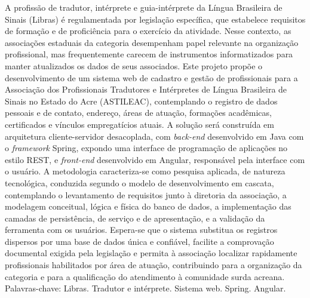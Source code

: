 \documentclass[
        oneside,      %
        english,			
        brazil			 
        ]{abntspiifac}
\begin{document}
\begin{resumo}

A profissão de tradutor, intérprete e guia-intérprete da Língua Brasileira de Sinais (Libras) é regulamentada por legislação específica, que estabelece requisitos de formação e de proficiência para o exercício da atividade. Nesse contexto, as associações estaduais da categoria desempenham papel relevante na organização profissional, mas frequentemente carecem de instrumentos informatizados para manter atualizados os dados de seus associados. Este projeto propõe o desenvolvimento de um sistema web de cadastro e gestão de profissionais para a Associação dos Profissionais Tradutores e Intérpretes de Língua Brasileira de Sinais no Estado do Acre (ASTILEAC), contemplando o registro de dados pessoais e de contato, endereço, áreas de atuação, formações acadêmicas, certificados e vínculos empregatícios atuais. A solução será construída em arquitetura cliente-servidor desacoplada, com \textit{back-end} desenvolvido em Java com o \textit{framework} Spring, expondo uma interface de programação de aplicações no estilo REST, e \textit{front-end} desenvolvido em Angular, responsável pela interface com o usuário. A metodologia caracteriza-se como pesquisa aplicada, de natureza tecnológica, conduzida segundo o modelo de desenvolvimento em cascata, contemplando o levantamento de requisitos junto à diretoria da associação, a modelagem conceitual, lógica e física do banco de dados, a implementação das camadas de persistência, de serviço e de apresentação, e a validação da ferramenta com os usuários. Espera-se que o sistema substitua os registros dispersos por uma base de dados única e confiável, facilite a comprovação documental exigida pela legislação e permita à associação localizar rapidamente profissionais habilitados por área de atuação, contribuindo para a organização da categoria e para a qualificação do atendimento à comunidade surda acreana. \\[18pt]
Palavras-chave: Libras. Tradutor e intérprete. Sistema web. Spring. Angular.
\end{resumo}
 
\end{document}
